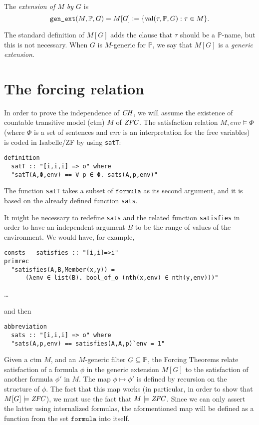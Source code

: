 \documentclass[11pt,english]{article}
\renewcommand{\PP}{\mathbb{P}}
\newcommand{\formula}{\ensuremath{\mathtt{formula}}}
\DeclareMathOperator{\val}{val}
\begin{document}
\begin{definition}
  The \emph{extension of $M$ by $G$} is
  \[
  \verb|gen_ext|(M,\PP,G) = M[G] \defi \{\val(\tau,\PP,G): \tau\in M\}.
  \]
\end{definition}
The standard definition of $M[G]$ adds the clause that $\tau$ should be
a $\PP$-name, but this is not necessary. When $G$ is $M$-generic for
$\PP$, we say that $M[G]$ is a \emph{generic extension}.

\section{The forcing relation}
In order to prove the independence of $\mathit{CH}$, we will assume the
existence of countable transitive model (ctm) $M$ of $\mathit{ZFC}$. The
satisfaction relation $M,\mathit{env}\models\Phi$ (where $\Phi$ is a set of
sentences and $\mathit{env}$ is an interpretation for the free
variables) is coded in Isabelle/ZF by using \verb|satT|:
\begin{verbatim}
definition
  satT :: "[i,i,i] => o" where
  "satT(A,Φ,env) == ∀ p ∈ Φ. sats(A,p,env)"
\end{verbatim}
The function \verb|satT| takes a subset of \formula{} as its second
argument, and it is based on the already defined function \verb|sats|.

\begin{framed}
  It might be necessary to redefine \verb|sats| and the related
  function \verb|satisfies| in order to have an independent argument $B$
  to be the range of values of the environment. We would have, for
  example, 
\begin{verbatim}
consts   satisfies :: "[i,i]=>i"
primrec 
  "satisfies(A,B,Member(x,y)) =
      (λenv ∈ list(B). bool_of_o (nth(x,env) ∈ nth(y,env)))"
\end{verbatim}
  \dots
  
\noindent and then
\begin{verbatim}
abbreviation
  sats :: "[i,i,i] => o" where
  "sats(A,p,env) == satisfies(A,A,p)`env = 1"
\end{verbatim}
\end{framed}

Given a ctm $M$, and an $M$-generic filter $G\sbq\PP$, the Forcing
Theorems relate satisfaction of a formula 
$\phi$ in the generic extension $M[G]$ to the satisfaction of another formula
$\phi'$ in $M$. The map $\phi\mapsto\phi'$ is defined by recursion on
the structure of $\phi$. The fact that this map works (in particular,
in order to show that $M[G]\models\mathit{ZFC}$), we must use the fact that
$M\models\mathit{ZFC}$. Since we can only assert the latter using internalized
formulas, the aformentioned map will be defined as a function from the
set \formula{} into itself. 
\end{document}
